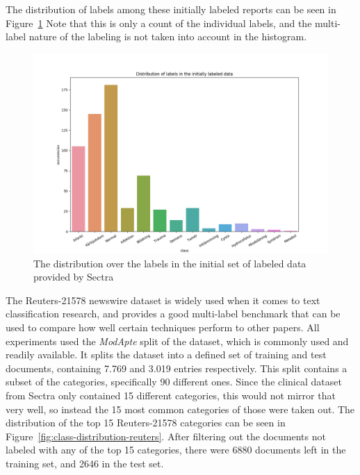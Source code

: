 The distribution of labels among these initially labeled reports can be seen in Figure~\ref{fig:class-distribution}
Note that this is only a count of the individual labels, and the multi-label nature of the labeling is not taken into account in the histogram.

\begin{figure}
    \includegraphics[scale=0.5]{figures/class-distribution.png}
    \caption{The distribution over the labels in the initial set of labeled data provided by Sectra}
    \label{fig:class-distribution}
\end{figure}

The Reuters-21578 newswire dataset is widely used when it comes to text classification research, and provides a good multi-label benchmark that can be used to compare how well certain techniques perform to other papers.
All experiments used the \textit{ModApte} split of the dataset, which is commonly used and readily available. %
It splits the dataset into a defined set of training and test documents, containing 7.769 and 3.019 entries respectively.
This split contains a subset of the categories, specifically 90 different ones.
Since the clinical dataset from Sectra only contained 15 different categories, this would not mirror that very well, so instead the 15 most common categories of those were taken out.
The distribution of the top 15 Reuters-21578 categories can be seen in Figure~\ref{fig:class-distribution-reuters}.
After filtering out the documents not labeled with any of the top 15 categories, there were 6880 documents left in the training set, and 2646 in the test set.


